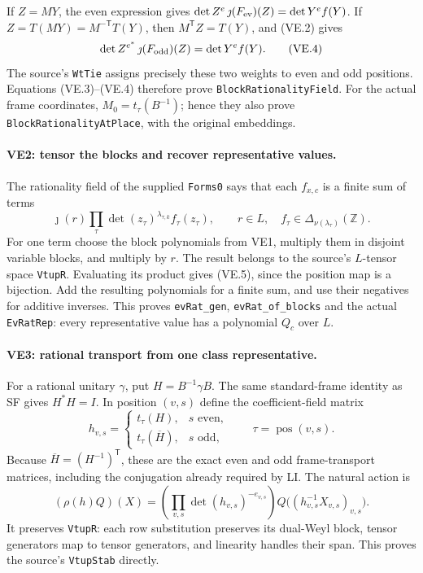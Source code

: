 \documentclass[11pt,a4paper]{article}
\numberwithin{equation}{section}
\theoremstyle{remark}\newtheorem{remark}[theorem]{Remark}
\begin{document}
If $Z=MY$, the even expression gives
$\det Z^e\,\jmath(F_{\rm ev})(Z)=\det Y^e f(Y)$.
If $Z=T(MY)=M^{-\mathsf T}T(Y)$, then
$M^{\mathsf T}Z=T(Y)$, and (VE.2) gives
\[
 \det Z^{e^*}\,\jmath(F_{\rm odd})(Z)=\det Y^e f(Y).
                                                        \tag{VE.4}
\]
The source's \texttt{WtTie} assigns precisely these two weights to
even and odd positions. Equations (VE.3)--(VE.4) therefore prove
\texttt{BlockRationalityField}. For the actual frame coordinates,
$M_0=t_\tau(B^{-1})$; hence they also prove
\texttt{BlockRationalityAtPlace}, with the original embeddings.

\paragraph{VE2: tensor the blocks and recover representative values.}
The rationality field of the supplied \texttt{Forms0} says that each
$f_{x,c}$ is a finite sum of terms
\[
 \jmath(r)\prod_\tau\det(z_\tau)^{\lambda_{\tau,k}}
                                  f_\tau(z_\tau),
 \qquad r\in L,\quad f_\tau\in\Delta_{\nu(\lambda_\tau)}(\mathbb Z).
                                                        \tag{VE.5}
\]
For one term choose the block polynomials from VE1, multiply them
in disjoint variable blocks, and multiply by $r$. The result belongs
to the source's $L$-tensor space \texttt{VtupR}. Evaluating its product
gives (VE.5), since the position map is a bijection. Add the resulting
polynomials for a finite sum, and use their negatives for additive
inverses. This proves \texttt{evRat\_\allowbreak gen}, \texttt{evRat\_\allowbreak of\_\allowbreak blocks}
and the actual \texttt{EvRatRep}: every representative value has a
polynomial $Q_c$ over $L$.

\paragraph{VE3: rational transport from one class representative.}
For a rational unitary $\gamma$, put $H=B^{-1}\gamma B$.
The same standard-frame identity as SF gives $H^*H=I$. In position
$(v,s)$ define the coefficient-field matrix
\[
 h_{v,s}=
 \begin{cases}
 t_\tau(H),&s\text{ even},\\
 t_\tau(\overline H),&s\text{ odd},
 \end{cases}
 \qquad\tau=\operatorname{pos}(v,s).
                                                        \tag{VE.6}
\]
Because $\overline H=(H^{-1})^{\mathsf T}$, these are the exact
even and odd frame-transport matrices, including the conjugation
already required by LI. The natural action is
\[
 (\rho(h)Q)(X)=
    \left(\prod_{v,s}\det(h_{v,s})^{-e_{v,s}}\right)
             Q\bigl((h_{v,s}^{-1}X_{v,s})_{v,s}\bigr).
                                                        \tag{VE.7}
\]
It preserves \texttt{VtupR}: each row substitution preserves its
dual-Weyl block, tensor generators map to tensor generators, and
linearity handles their span. This proves the source's
\texttt{VtupStab} directly.
\end{document}
